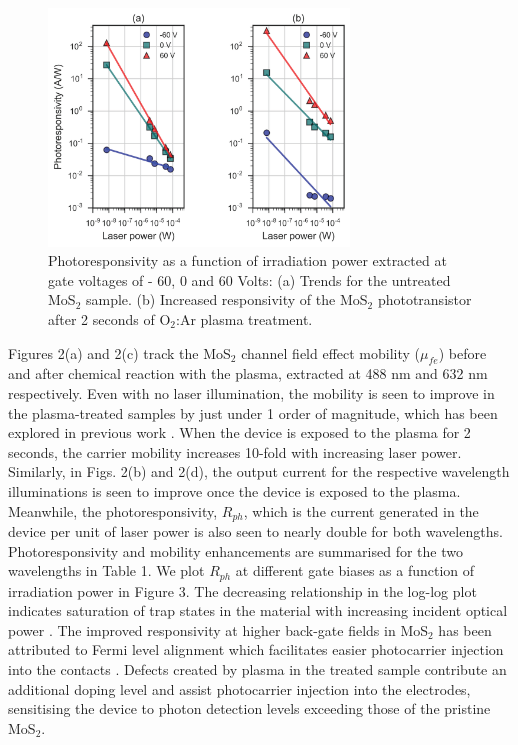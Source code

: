 \documentclass[%
 reprint,
superscriptaddress,
 amsmath,amssymb,
 aps,
prb,
]{revtex4-1}
\begin{document}
\twocolumngrid
\begin{center}
\begin{figure}[!htb]
\includegraphics[width=80mm]{R_ph}
\caption{Photoresponsivity as a function of irradiation power extracted at gate voltages of - 60, 0 and 60 Volts: (a) Trends for the untreated MoS$_2$ sample. (b) Increased responsivity of the MoS$_2$ phototransistor after 2 seconds of O$_2$:Ar plasma treatment.}
\end{figure}
\end{center}
\indent Figures 2(a) and 2(c) track the MoS$_2$ channel field effect mobility ($\mu_{fe}$) before and after chemical reaction with the plasma, extracted at 488 nm and 632 nm respectively. Even with no laser illumination, the mobility is seen to improve in the plasma-treated samples by just under 1 order of magnitude, which has been explored in previous work \cite{jadwiszczak2017oxide}. When the device is exposed to the plasma for 2 seconds, the carrier mobility increases 10-fold with increasing laser power. Similarly, in Figs. 2(b) and 2(d), the output current for the respective wavelength illuminations is seen to improve once the device is exposed to the plasma. Meanwhile, the photoresponsivity, $R_{ph}$, which is the current generated in the device per unit of laser power is also seen to nearly double for both wavelengths. Photoresponsivity and mobility enhancements are summarised for the two wavelengths in Table 1. \newline
\indent We plot $R_{ph}$ at different gate biases as a function of irradiation power in Figure 3. The decreasing relationship in the log-log plot indicates saturation of trap states in the material with increasing incident optical power \cite{LopezSanchez2013, Yu2014,Wang2015}. The improved responsivity at higher back-gate fields in MoS$_2$ has been attributed to Fermi level alignment which facilitates easier photocarrier injection into the contacts \cite{Yin2012, Kufer2015, Chen2015}. Defects created by plasma in the treated sample contribute an additional doping level and assist photocarrier injection into the electrodes, sensitising the device to photon detection levels exceeding those of the pristine MoS$_2$.
\end{document}
